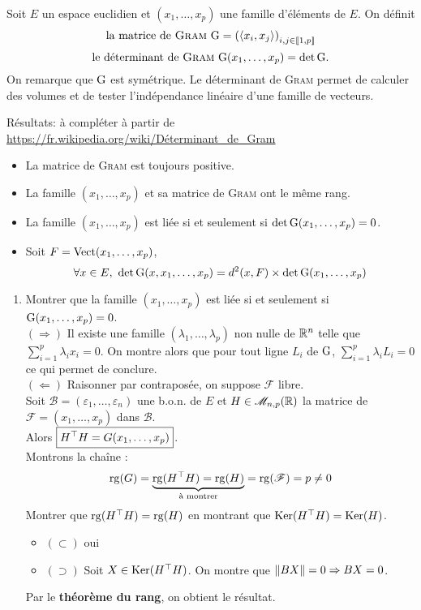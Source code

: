 \begin{tcolorbox}
    Soit $E$ un espace euclidien et $(x_1, \dots, x_p)$ une famille d'éléments de $E$. On définit
    $$\text{la matrice de \textsc{Gram} } \mathrm{G} = \left( \langle x_i, x_j \rangle \right)_{i,j \in \llbracket 1, p \rrbracket}$$
    $$\text{le déterminant de \textsc{Gram} } \mathrm{G}(x_1, \dots, x_p) = \det \mathrm{G}.$$
    On remarque que $\mathrm{G}$ est symétrique. 
    Le déterminant de \textsc{Gram} permet de calculer des volumes et de tester l'indépendance linéaire d'une famille de vecteurs.
\end{tcolorbox}

Résultats: à compléter à partir de \url{https://fr.wikipedia.org/wiki/Déterminant_de_Gram}
\begin{itemize}
    \item La matrice de \textsc{Gram} est toujours positive.
    \item La famille $(x_1, \dots, x_p)$ et sa matrice de \textsc{Gram} ont le même rang.
    \item La famille $(x_1, \dots, x_p)$ est liée si et seulement si $\det \mathrm{G}(x_1, \dots, x_p) = 0$.
    \item Soit $F = \mathrm{Vect}(x_1, \dots, x_p)$,
    $$\forall x \in E,\ \det \mathrm{G}(x, x_1, \dots, x_p) = d^2(x, F) \times \det \mathrm{G}(x_1, \dots, x_p)$$
\end{itemize} 

\begin{enumerate}
    \item Montrer que la famille $(x_1, \dots, x_p)$ est liée si et seulement si $\mathrm{G}(x_1, \dots, x_p) = 0$. \\
    $(\Rightarrow)$ Il existe une famille $(\lambda_1, \dots, \lambda_p)$ non nulle  de $\mathbb{R}^n$ telle que $\sum\limits_{i=1}^{p} \lambda_i x_i = 0$. On montre alors que pour tout ligne $L_i$ de $\mathrm{G}$, $\sum\limits_{i=1}^{p} \lambda_i L_i = 0$ ce qui permet de conclure. \\
    $(\Leftarrow)$ Raisonner par contraposée, on suppose $\mathscr{F}$ libre. \\
    Soit $\mathscr{B} = (\varepsilon_1, \dots, \varepsilon_n)$ une b.o.n. de $E$ et $H \in \mathscr{M}_{n, p} (\mathbb{R})$ la matrice de $\mathscr{F} = (x_1, \dots, x_p)$ dans $\mathscr{B}$. \\
    Alors $\boxed{H^\top H = G(x_1, \dots, x_p)}$. \\
    Montrons la chaîne :
    $$\mathrm{rg}(G) = \underbrace{\mathrm{rg}(H^\top H) = \mathrm{rg}(H)}_{\text{à montrer}} = \mathrm{rg}(\mathscr{F}) = p \not= 0$$
    Montrer que $\mathrm{rg}(H^\top H) = \mathrm{rg}(H)$ en montrant que $\mathrm{Ker}(H^\top H) = \mathrm{Ker}(H)$. 
    \begin{itemize}
        \item $(\subset)$ oui
        \item $(\supset)$ Soit $X \in \mathrm{Ker}(H^\top H)$. On montre que $\Vert BX \Vert = 0 \Rightarrow BX = 0$. 
    \end{itemize}
    Par le \textbf{théorème du rang}, on obtient le résultat. 
\end{enumerate}

